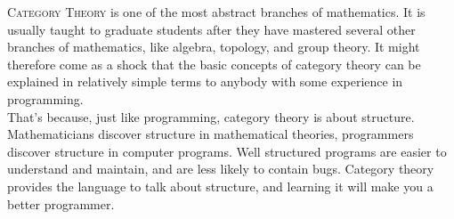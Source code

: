 
{
\fontsize{16}{18.5}\selectfont
\lettrine[lhang=0.17]{C}{ategory Theory}
is one of the most abstract branches of mathematics. It is usually taught to
graduate students after they have mastered several other branches of mathematics,
like algebra, topology, and group theory. It might therefore come as a shock that
the basic concepts of category theory can be explained in relatively simple terms
to anybody with some experience in programming. \\

That's because, just like programming,
category theory is about structure. Mathematicians discover structure in mathematical
theories, programmers discover structure in computer programs. Well structured programs
are easier to understand and maintain, and are less likely to contain bugs. Category theory provides the language to talk about structure, and learning it will make you
a better programmer.
\vfil

}
